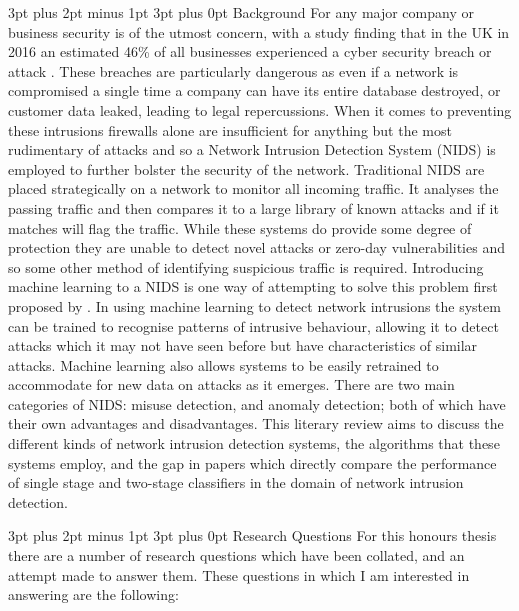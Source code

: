 \documentclass[12pt,a4paper]{article}
\makeatletter
\renewcommand\subsection{\@startsection {subsection}{1}{2mm} %
      {3pt plus 2pt minus 1pt} %
      {3pt plus 0pt} %
      {\normalfont\bfseries}}
\makeatother
\begin{document}
\subsection{Background}
	For any major company or business security is of the utmost concern, with a study finding that in the UK in 2016 an estimated 46\% of all businesses experienced a cyber security breach or attack \cite{securitysurvey2017}. These breaches are particularly dangerous as even if a network is compromised a single time a company can have its entire database destroyed, or customer data leaked, leading to legal repercussions. When it comes to preventing these intrusions firewalls alone are insufficient for anything but the most rudimentary of attacks and so a Network Intrusion Detection System (NIDS) is employed to further bolster the security of the network. Traditional NIDS are placed strategically on a network to monitor all incoming traffic. It analyses the passing traffic and then compares it to a large library of known attacks and if it matches will flag the traffic. While these systems do provide some degree of protection they are unable to detect novel attacks or zero-day vulnerabilities and so some other method of identifying suspicious traffic is required. Introducing machine learning to a NIDS is one way of attempting to solve this problem first proposed by \cite{denning1987intrusion}. In using machine learning to detect network intrusions the system can be trained to recognise patterns of intrusive behaviour, allowing it to detect attacks which it may not have seen before but have characteristics of similar attacks. Machine learning also allows systems to be easily retrained to accommodate for new data on attacks as it emerges. There are two main categories of NIDS: misuse detection, and anomaly detection; both of which have their own advantages and disadvantages. This literary review aims to discuss the different kinds of network intrusion detection systems, the algorithms that these systems employ, and the gap in papers which directly compare the performance of single stage and two-stage classifiers in the domain of network intrusion detection.
		
\subsection{Research Questions}
	For this honours thesis there are a number of research questions which have been collated, and an attempt made to answer them. These questions in which I am interested in answering are the following: 
		
\end{document}
